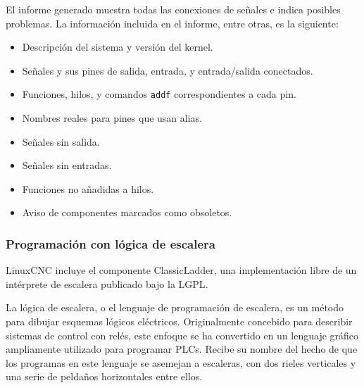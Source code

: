 \documentclass[english,spanish,a4paper,11pt]{article}
\begin{document}
El informe generado muestra todas las conexiones de señales e indica posibles problemas. La información incluida en el informe, entre otras, es la siguiente:
%
\begin{itemize}
    \item Descripción del sistema y versión del kernel.
    \item Señales y sus pines de salida, entrada, y entrada/salida conectados.
    \item Funciones, hilos, y comandos \texttt{addf} correspondientes a cada pin.
    \item Nombres reales para pines que usan alias.
    \item Señales sin salida.
    \item Señales sin entradas.
    \item Funciones no añadidas a hilos.
    \item Aviso de componentes marcados como obsoletos.
\end{itemize}


\subsubsection{Programación con lógica de escalera}

LinuxCNC incluye el componente ClassicLadder, una implementación libre de un intérprete de escalera publicado bajo la \ac{LGPL}.

La lógica de escalera, o el lenguaje de programación de escalera, es un método para dibujar esquemas lógicos eléctricos. Originalmente concebido para describir sistemas de control con relés, este enfoque se ha convertido en un lenguaje gráfico ampliamente utilizado para programar \acp{PLC}. Recibe su nombre del hecho de que los programas en este lenguaje se asemejan a escaleras, con dos rieles verticales y una serie de peldaños horizontales entre ellos.


\end{document}
